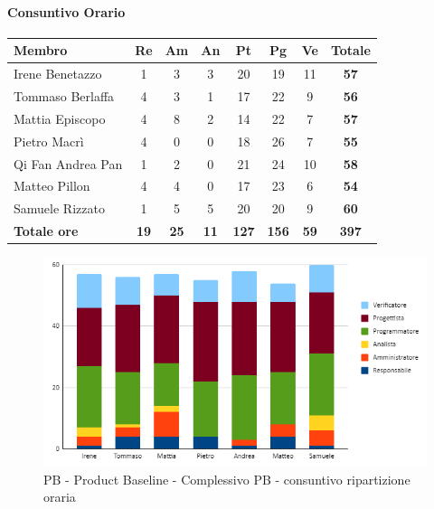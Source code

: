 \paragraph{Consuntivo Orario}
\begin{center}
	\renewcommand{\arraystretch}{1.8} %
	\begin{tabular}{ |m{8em}|c|c|c|c|c|c|c| }
	\hline
	\textbf{Membro} & \textbf{Re} & \textbf{Am} &  \textbf{An} &  \textbf{Pt} &  \textbf{Pg} &  \textbf{Ve} &  \textbf{Totale}\\
    \hline
    Irene Benetazzo   & 1 & 3 & 3 & 20 & 19 & 11 & \textbf{57} \\
    \hline
    Tommaso Berlaffa  & 4 & 3 & 1 & 17 & 22 & 9 & \textbf{56} \\
    \hline
    Mattia Episcopo   & 4 & 8 & 2 & 14 & 22 & 7 & \textbf{57} \\
    \hline
    Pietro Macrì      & 4 & 0 & 0 & 18 & 26 & 7 & \textbf{55} \\
    \hline
    Qi Fan Andrea Pan & 1 & 2 & 0 & 21 & 24 & 10 & \textbf{58} \\
    \hline
    Matteo Pillon     & 4 & 4 & 0 & 17 & 23 & 6 & \textbf{54} \\
    \hline
    Samuele Rizzato   & 1 & 5 & 5 & 20 & 20 & 9 & \textbf{60} \\
    \hline
    \textbf{Totale ore} & \textbf{19} & \textbf{25} & \textbf{11} & \textbf{127} & \textbf{156} & \textbf{59} & \textbf{397} \\
    \hline
	\end{tabular}
\end{center}
\begin{figure}[H]
    \centering\includegraphics[width=\textwidth, height=\textheight,keepaspectratio]{images/consuntivo/consuntivo-PB-ore-totale.png}
    \caption{PB - Product Baseline - Complessivo PB - consuntivo ripartizione oraria}
\end{figure}
\newpage

